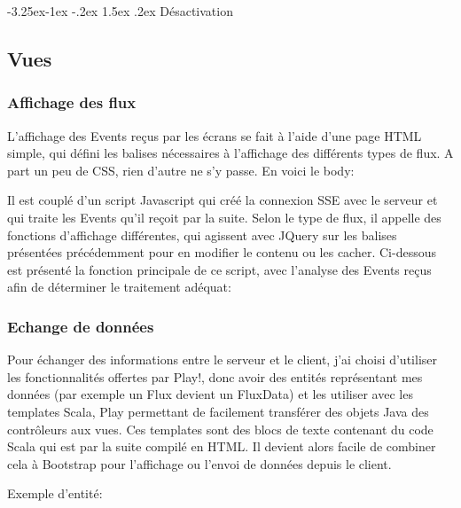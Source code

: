 \documentclass[french]{article}
\makeatletter
\renewcommand\paragraph{\@startsection{paragraph}{4}{\z@}%
                                     {-3.25ex\@plus -1ex \@minus -.2ex}%
                                     {1.5ex \@plus .2ex}%
                                     {\normalfont\normalsize\bfseries}}
\makeatother
\begin{document}
\paragraph{Désactivation}


\newpage
\subsection{Vues}

\subsubsection{Affichage des flux}

L'affichage des Events reçus par les écrans se fait à l'aide d'une page HTML simple, qui défini les balises nécessaires à l'affichage des différents types de flux. A part un peu de CSS, rien d'autre ne s'y passe. En voici le body:



Il est couplé d'un script Javascript qui créé la connexion SSE avec le serveur et qui traite les Events qu'il reçoit par la suite. Selon le type de flux, il appelle des fonctions d'affichage différentes, qui agissent avec JQuery sur les balises présentées précédemment pour en modifier le contenu ou les cacher. Ci-dessous est présenté la fonction principale de ce script, avec l'analyse des Events reçus afin de déterminer le traitement adéquat:




\subsubsection{Echange de données}

Pour échanger des informations entre le serveur et le client, j'ai choisi  d'utiliser les fonctionnalités offertes par Play!, donc avoir des entités représentant mes données (par exemple un Flux devient un FluxData) et les utiliser avec les templates Scala, Play permettant de facilement transférer des objets Java des contrôleurs aux vues. Ces templates sont des blocs de texte contenant du code Scala qui est par la suite compilé en HTML. Il devient alors facile de combiner cela à Bootstrap pour l'affichage ou l'envoi de données depuis le client.

Exemple d'entité:

\end{document}
